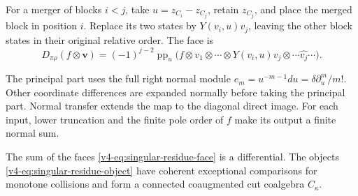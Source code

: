For a merger of blocks \(i<j\), take
\(u=z_{C_i}-z_{C_j}\), retain \(z_{C_j}\), and place
the merged block in position \(i\). Replace its two
states by \(Y(v_i,u)v_j\), leaving the other block
states in their original relative order. The face is
\begin{equation}\label{v4-eq:singular-residue-face}
 D_{\pi\rho}(f\otimes\mathbf v)
   =(-1)^{j-2}\operatorname{pp}_u
      \bigl(f\otimes
       v_1\otimes\cdots\otimes Y(v_i,u)v_j
                    \otimes\cdots\widehat{v_j}\cdots\bigr).
\end{equation}

The principal part uses the full right normal module
\(e_m=u^{-m-1}du=\delta\partial_u^m/m!\).
Other coordinate differences are expanded normally
before taking the principal part. Normal transfer
extends the map to the diagonal direct image.
For each input, lower truncation and the finite pole
order of \(f\) make its output a finite normal sum.

\begin{theorem}\label{v4-thm:singular-residue-coalgebra}
The sum of the faces \eqref{v4-eq:singular-residue-face}
is a differential. The objects \eqref{v4-eq:singular-residue-object}
have coherent exceptional comparisons for monotone
collisions and form a connected coaugmented cut
coalgebra \(C_\kappa\).
\end{theorem}

